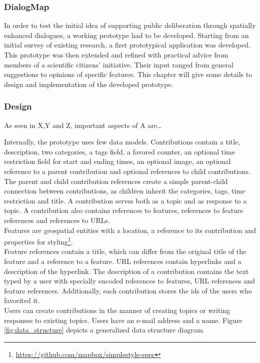 \documentclass{sigchi}
\begin{document}
\subsubsection{DialogMap}

In order to test the initial idea of supporting public deliberation through spatially enhanced dialogues, a working prototype had to be developed. Starting from an initial survey of existing research, a first prototypical application was developed. This prototype was then extended and refined with practical advice from members of a scientific citizens' initiative. Their input ranged from general suggestions to opinions of specific features. This chapter will give some details to design and implementation of the developed prototype.


\subsubsection{Design} %

As seen in X,Y and Z, important aspects of A are\dots

Internally, the prototype uses few data models. Contributions contain a title, description, two categories, a tags field, a favored counter, an optional time restriction field for start and ending times, an optional image, an optional reference to a parent contribution and optional references to child contributions. The parent and child contribution references create a simple parent-child connection between contributions, as children inherit the categories, tags, time restriction and title. A contribution serves both as a topic and as response to a topic. A contribution also contains references to features, references to feature references and references to URLs.\\
Features are geospatial entities with a location, a reference to its contribution and properties for styling\footnote{\url{https://github.com/mapbox/simplestyle-spec}}.\\
Feature references contain a title, which can differ from the original title of the feature and a reference to a feature. URL references contain hyperlinks and a description of the hyperlink. The description of a contribution contains the text typed by a user with specially encoded references to features, URL references and feature references. Additionally, each contribution stores the ids of the users who favorited it.\\
Users can create contributions in the manner of creating topics or writing responses to existing topics. Users have an e-mail address and a name. Figure \ref{fig:data_structure} depicts a generalized data structure diagram.
\end{document}
